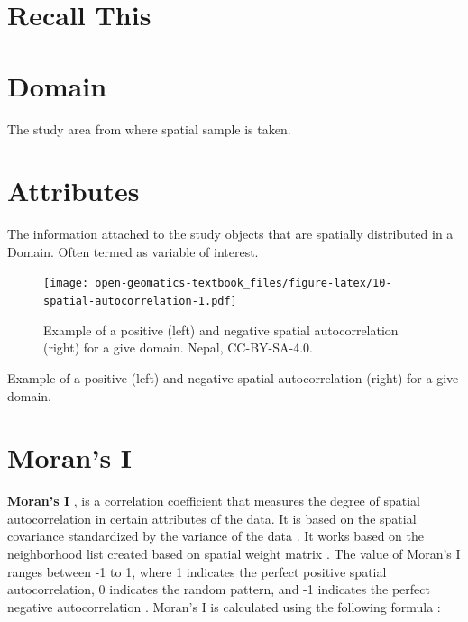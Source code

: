 \documentclass[
]{book}
\begin{document}
\hypertarget{recall-this-2}{%
\section*{Recall This}\label{recall-this-2}}

\hypertarget{domain}{%
\section{Domain}\label{domain}}

The study area from where spatial sample is taken.

\hypertarget{attributes}{%
\section{Attributes}\label{attributes}}

The information attached to the study objects that are spatially distributed in a Domain. Often termed as variable of interest.

\begin{figure}
\centering
\texttt{[image: open-geomatics-textbook\_files/figure-latex/10-spatial-autocorrelation-1.pdf]}
\caption{\label{fig:10-spatial-autocorrelation}Example of a positive (left) and negative spatial autocorrelation (right) for a give domain. Nepal, CC-BY-SA-4.0.}
\end{figure}

Example of a positive (left) and negative spatial autocorrelation (right) for a give domain.

\hypertarget{morans-i}{%
\section{Moran's I}\label{morans-i}}

\textbf{Moran's I} \citep{moran_notes_1950}, is a correlation coefficient that measures the degree of spatial autocorrelation in certain attributes of the data. It is based on the spatial covariance standardized by the variance of the data \citep{moran_notes_1950}. It works based on the neighborhood list created based on spatial weight matrix \citep{suryowati_comparison_2018}. The value of Moran's I ranges between -1 to 1, where 1 indicates the perfect positive spatial autocorrelation, 0 indicates the random pattern, and -1 indicates the perfect negative autocorrelation \citep{moran_notes_1950}. Moran's I is calculated using the following formula \citep{moran_notes_1950}:
\end{document}
